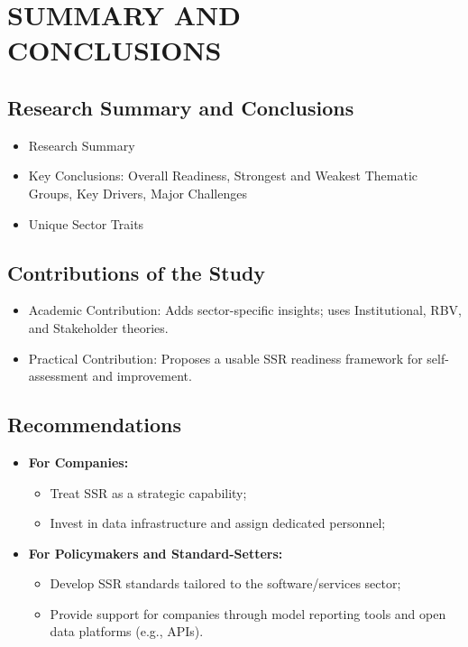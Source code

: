 \chapter{SUMMARY AND CONCLUSIONS}

\section{Research Summary and Conclusions}

\begin{itemize}
    \item Research Summary
    \item Key Conclusions: Overall Readiness, Strongest and Weakest Thematic Groups, Key Drivers, Major Challenges
    \item Unique Sector Traits
\end{itemize}


\section{Contributions of the Study}


\begin{itemize}
    \item  Academic Contribution: Adds sector-specific insights; uses Institutional, RBV, and Stakeholder theories.
    \item Practical Contribution: Proposes a usable SSR readiness framework for self-assessment and improvement.
\end{itemize}


\section{Recommendations}

\begin{itemize}
    \item \textbf{For Companies:}
    \begin{itemize}
        \item Treat SSR as a strategic capability;
        \item Invest in data infrastructure and assign dedicated personnel;
    \end{itemize}

    \item \textbf{For Policymakers and Standard-Setters:}
    \begin{itemize}
        \item Develop SSR standards tailored to the software/services sector;
        \item Provide support for companies through model reporting tools and open data platforms (e.g., APIs).
    \end{itemize}
\end{itemize}

